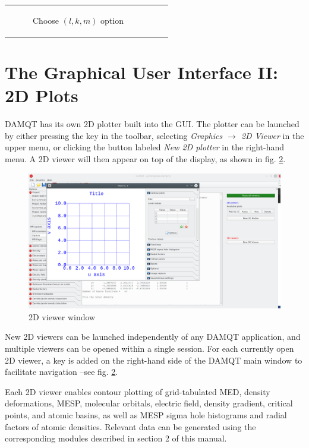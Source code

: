 \documentclass[10pt]{article}
\begin{document}
\begin{tabular}{lcr}
\begin{minipage}{.3\linewidth}
\begin{figure}[H]
\begin{center}
\end{center}
\caption{{Choose $(l,k,m)$ option}\label{fig:2_14_4}}
\end{figure}
\end{minipage}
\end{tabular}

\newpage

\section{The Graphical User Interface II: 2D Plots \label{sec:3}}

DAMQT has its own 2D plotter built into the GUI. The plotter can be launched by either pressing the 
key \bigtoolbC in the toolbar, selecting {\it Graphics $\rightarrow$ 2D Viewer} in the upper menu,  
or clicking the button labeled {\it New 2D plotter} in the right-hand menu.  
A 2D viewer will then appear on top of the display, as shown in fig. \ref{fig:3_1}.    
   
\vspace*{5mm}

\begin{figure}[H]
\begin{center}
\vspace*{0mm}
\includegraphics[width=.5\linewidth]{damqt320_2D_start_window.png}
\end{center}
\vspace*{0cm}
\caption{{2D viewer window}\label{fig:3_1}}
\end{figure}

\vspace*{5mm}

New 2D viewers can be launched independently of any DAMQT application,  
and multiple viewers can be opened within a single session.  
For each currently open 2D viewer, a key is added on the right-hand side of the DAMQT  
main window to facilitate navigation --see fig. \ref{fig:3_1}.  

Each 2D viewer enables contour plotting of grid-tabulated  
MED, density deformations, MESP, molecular orbitals, electric field, density gradient,  
critical points, and atomic basins, as well as MESP sigma hole histograms  
and radial factors of atomic densities.  
Relevant data can be generated using the corresponding modules described in section 2 of this manual.  
\end{document}
